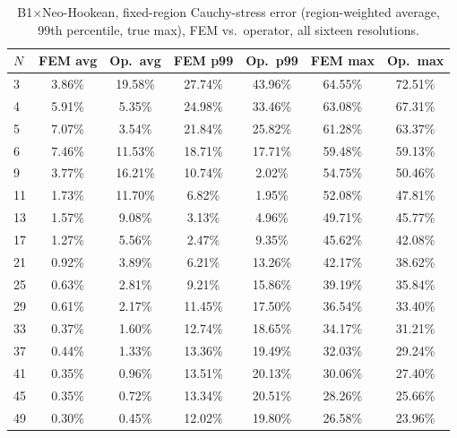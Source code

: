 \documentclass[final,5p,times]{elsarticle}
\begin{document}
\begin{table}[ht]
\centering
\caption{B1$\times$Neo-Hookean, fixed-region Cauchy-stress error
  (region-weighted average, 99th percentile, true max), FEM vs.\
  operator, all sixteen resolutions.}
\label{tab:b1-b1nh-b}
\scriptsize
\begin{tabular}{lcccccc}
\toprule
$N$ & FEM avg & Op.\ avg & FEM p99 & Op.\ p99 & FEM max & Op.\ max \\
\midrule
3  & 3.86\% & 19.58\% & 27.74\% & 43.96\% & 64.55\% & 72.51\% \\
4  & 5.91\% & 5.35\%  & 24.98\% & 33.46\% & 63.08\% & 67.31\% \\
5  & 7.07\% & 3.54\%  & 21.84\% & 25.82\% & 61.28\% & 63.37\% \\
6  & 7.46\% & 11.53\% & 18.71\% & 17.71\% & 59.48\% & 59.13\% \\
9  & 3.77\% & 16.21\% & 10.74\% & 2.02\%  & 54.75\% & 50.46\% \\
11 & 1.73\% & 11.70\% & 6.82\%  & 1.95\%  & 52.08\% & 47.81\% \\
13 & 1.57\% & 9.08\%  & 3.13\%  & 4.96\%  & 49.71\% & 45.77\% \\
17 & 1.27\% & 5.56\%  & 2.47\%  & 9.35\%  & 45.62\% & 42.08\% \\
21 & 0.92\% & 3.89\%  & 6.21\%  & 13.26\% & 42.17\% & 38.62\% \\
25 & 0.63\% & 2.81\%  & 9.21\%  & 15.86\% & 39.19\% & 35.84\% \\
29 & 0.61\% & 2.17\%  & 11.45\% & 17.50\% & 36.54\% & 33.40\% \\
33 & 0.37\% & 1.60\%  & 12.74\% & 18.65\% & 34.17\% & 31.21\% \\
37 & 0.44\% & 1.33\%  & 13.36\% & 19.49\% & 32.03\% & 29.24\% \\
41 & 0.35\% & 0.96\%  & 13.51\% & 20.13\% & 30.06\% & 27.40\% \\
45 & 0.35\% & 0.72\%  & 13.34\% & 20.51\% & 28.26\% & 25.66\% \\
49 & 0.30\% & 0.45\%  & 12.02\% & 19.80\% & 26.58\% & 23.96\% \\
\bottomrule
\end{tabular}
\end{table}
\end{document}
